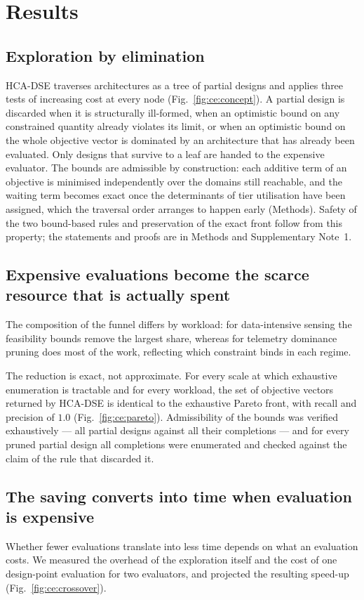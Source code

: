 \section{Results}
\label{sec:sn:results}

\subsection{Exploration by elimination}
HCA-DSE traverses architectures as a tree of partial designs and applies three tests of
increasing cost at every node (Fig.~\ref{fig:ce:concept}). A partial design is discarded
when it is structurally ill-formed, when an optimistic bound on any constrained quantity
already violates its limit, or when an optimistic bound on the whole objective vector is
dominated by an architecture that has already been evaluated. Only designs that survive
to a leaf are handed to the expensive evaluator. The bounds are admissible by
construction: each additive term of an objective is minimised independently over the
domains still reachable, and the waiting term becomes exact once the determinants of tier
utilisation have been assigned, which the traversal order arranges to happen early
(Methods). Safety of the two bound-based rules and preservation of the exact front follow
from this property; the statements and proofs are in Methods and Supplementary Note~1.

\subsection{Expensive evaluations become the scarce resource that is actually spent}

The composition of the funnel differs by workload: for data-intensive sensing the
feasibility bounds remove the largest share, whereas for telemetry dominance pruning does
most of the work, reflecting which constraint binds in each regime.

The reduction is exact, not approximate. For every scale at which exhaustive enumeration
is tractable and for every workload, the set of objective vectors returned by HCA-DSE is
identical to the exhaustive Pareto front, with recall and precision of $1.0$
(Fig.~\ref{fig:ce:pareto}). Admissibility of the bounds was verified exhaustively --- all
partial designs against all their completions --- and for every pruned partial design all
completions were enumerated and checked against the claim of the rule that discarded it.


\subsection{The saving converts into time when evaluation is expensive}
Whether fewer evaluations translate into less time depends on what an evaluation costs.
We measured the overhead of the exploration itself and the cost of one design-point
evaluation for two evaluators, and projected the resulting speed-up
(Fig.~\ref{fig:ce:crossover}).


